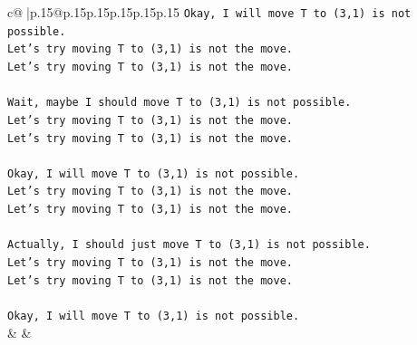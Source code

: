 \documentclass{article}
\begin{document}
{\begin{supertabular}{c@{$\;$}|p{.15\linewidth}@{}p{.15\linewidth}p{.15\linewidth}p{.15\linewidth}p{.15\linewidth}p{.15\linewidth}}
{{{\texttt{Okay, I will move T to (3,1) is not possible.} \\
\texttt{Let's try moving T to (3,1) is not the move.} \\
\texttt{Let's try moving T to (3,1) is not the move.} \\
\\ 
\texttt{Wait, maybe I should move T to (3,1) is not possible.} \\
\texttt{Let's try moving T to (3,1) is not the move.} \\
\texttt{Let's try moving T to (3,1) is not the move.} \\
\\ 
\texttt{Okay, I will move T to (3,1) is not possible.} \\
\texttt{Let's try moving T to (3,1) is not the move.} \\
\texttt{Let's try moving T to (3,1) is not the move.} \\
\\ 
\texttt{Actually, I should just move T to (3,1) is not possible.} \\
\texttt{Let's try moving T to (3,1) is not the move.} \\
\texttt{Let's try moving T to (3,1) is not the move.} \\
\\ 
\texttt{Okay, I will move T to (3,1) is not possible.} \\
            }
        }
    }
    & & \\ \\


\end{supertabular}}
\end{document}
